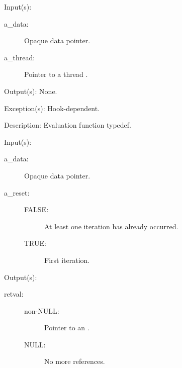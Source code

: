 \begin{capi}
\label{cw_nxo_hook_eval_t}
	\begin{capilist}
	\item[Input(s): ]
		\begin{description}\item[]
		\item[a\_data: ]
			Opaque data pointer.
		\item[a\_thread: ]
			Pointer to a thread .
		\end{description}
	\item[Output(s): ] None.
	\item[Exception(s): ] Hook-dependent.
	\item[Description: ]
		Evaluation function typedef.
	\end{capilist}
\label{cw_nxo_hook_ref_iter_t}
	\begin{capilist}
	\item[Input(s): ]
		\begin{description}\item[]
		\item[a\_data: ]
			Opaque data pointer.
		\item[a\_reset: ]
			\begin{description}\item[]
			\item[FALSE: ]
				At least one iteration has already occurred.
			\item[TRUE: ]
				First iteration.
			\end{description}
		\end{description}
	\item[Output(s): ]
		\begin{description}\item[]
		\item[retval: ]
			\begin{description}\item[]
			\item[non-NULL: ]
				Pointer to an \classname{nxoe}.
			\item[NULL: ]
				No more references.
			\end{description}
		\end{description}

\end{capilist}
\end{capi}
